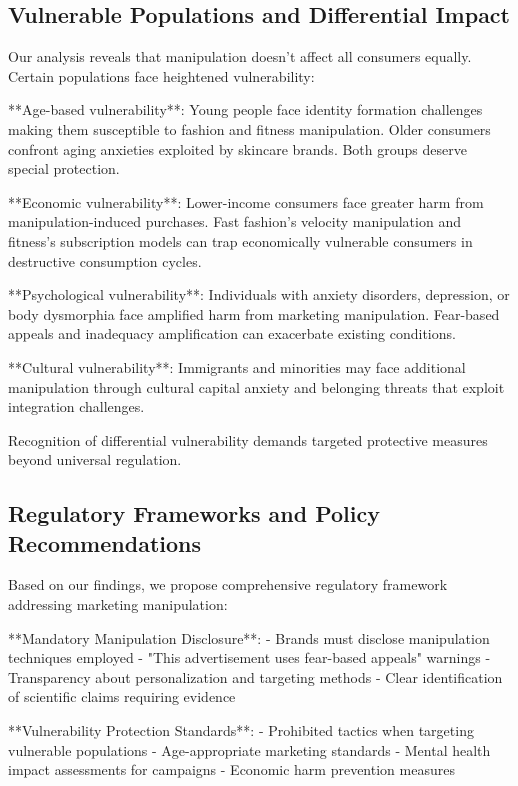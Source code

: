 \subsection{Vulnerable Populations and Differential Impact}

Our analysis reveals that manipulation doesn't affect all consumers equally. Certain populations face heightened vulnerability:

**Age-based vulnerability**: Young people face identity formation challenges making them susceptible to fashion and fitness manipulation. Older consumers confront aging anxieties exploited by skincare brands. Both groups deserve special protection.

**Economic vulnerability**: Lower-income consumers face greater harm from manipulation-induced purchases. Fast fashion's velocity manipulation and fitness's subscription models can trap economically vulnerable consumers in destructive consumption cycles.

**Psychological vulnerability**: Individuals with anxiety disorders, depression, or body dysmorphia face amplified harm from marketing manipulation. Fear-based appeals and inadequacy amplification can exacerbate existing conditions.

**Cultural vulnerability**: Immigrants and minorities may face additional manipulation through cultural capital anxiety and belonging threats that exploit integration challenges.

Recognition of differential vulnerability demands targeted protective measures beyond universal regulation.

\subsection{Regulatory Frameworks and Policy Recommendations}

Based on our findings, we propose comprehensive regulatory framework addressing marketing manipulation:

**Mandatory Manipulation Disclosure**:
- Brands must disclose manipulation techniques employed
- "This advertisement uses fear-based appeals" warnings
- Transparency about personalization and targeting methods
- Clear identification of scientific claims requiring evidence

**Vulnerability Protection Standards**:
- Prohibited tactics when targeting vulnerable populations
- Age-appropriate marketing standards
- Mental health impact assessments for campaigns
- Economic harm prevention measures

